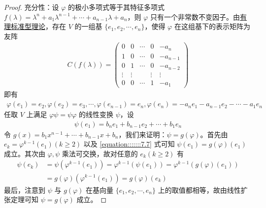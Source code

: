 \documentclass[../../main.tex]{subfiles}
\begin{document}
\begin{proof}
{\heiti 充分性：}设 $\varphi$ 的极小多项式等于其特征多项式 $f(\lambda)=\lambda^n + a_1\lambda^{n - 1}+\cdots + a_{n - 1}\lambda + a_n$，则 $\varphi$ 只有一个非常数不变因子。由\hyperref[theorem:有理标准型核心定理]{有理标准型理论}，存在 $V$ 的一组基 $\{e_1,e_2,\cdots,e_n\}$，使得 $\varphi$ 在这组基下的表示矩阵为友阵
\begin{align*}
C(f(\lambda))=\begin{pmatrix}
0 & 0 & \cdots & 0 & -a_n \\
1 & 0 & \cdots & 0 & -a_{n - 1} \\
0 & 1 & \cdots & 0 & -a_{n - 2} \\
\vdots & \vdots & & \vdots & \vdots \\
0 & 0 & \cdots & 1 & -a_1
\end{pmatrix}
\end{align*}
即有
\begin{align*}
\varphi(e_1)=e_2,\varphi(e_2)=e_3,\cdots,\varphi(e_{n - 1})=e_n,\varphi(e_n)=-a_ne_1 - a_{n - 1}e_2 - \cdots - a_1e_n
\end{align*}
任取 $V$ 上满足 $\varphi\psi = \psi\varphi$ 的线性变换 $\psi$，设
\begin{align}
\psi(e_1)=b_ne_1 + b_{n - 1}e_2 + \cdots + b_1e_n\label{equation:::::::7.7}
\end{align}
令 $g(x)=b_1x^{n - 1}+\cdots + b_{n - 1}x + b_n$，我们来证明：$\psi = g(\varphi)$。首先由 $e_k=\varphi^{k - 1}(e_1)(k\geq 2)$ 以及 \eqref{equation:::::::7.7} 式可知 $\psi(e_1)=g(\varphi)(e_1)$ 成立。其次由 $\varphi,\psi$ 乘法可交换，故对任意的 $e_k(k\geq 2)$ 有
\begin{align*}
\psi(e_k)&=\psi(\varphi^{k - 1}(e_1))=\varphi^{k - 1}(\psi(e_1))=\varphi^{k - 1}(g(\varphi)(e_1))\\
&=g(\varphi)(\varphi^{k - 1}(e_1))=g(\varphi)(e_k)
\end{align*}
最后，注意到 $\psi$ 与 $g(\varphi)$ 在基向量 $\{e_1,e_2,\cdots,e_n\}$ 上的取值都相等，故由线性扩张定理可知 $\psi = g(\varphi)$ 成立。


\end{proof}
\end{document}
